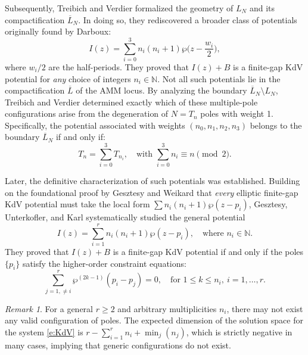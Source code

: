 \documentclass[11pt]{amsart}
\theoremstyle{remark}
\newtheorem{remark}[theorem]{Remark}
\numberwithin{equation}{section}
\begin{document}
Subsequently, Treibich and Verdier \cite{Treibich_Verdier_1990} formalized the geometry of $L_N$ and its compactification $\overline{L}_N$. In doing so, they rediscovered a broader class of potentials originally found by Darboux:
\[
    I(z) = \sum_{i=0}^3 n_i(n_i+1) \wp\Big(z- \frac{w_i}{2}\Big),
\]
where $w_i/2$ are the half-periods. They proved that $I(z)+B$ is a finite-gap KdV potential for \textit{any} choice of integers $n_i \in \mathbb{N}$. 
Not all such potentials lie in the compactification $\overline{L}$ of the AMM locus. By analyzing the boundary $\overline{L}_N \setminus L_N$, Treibich and Verdier determined exactly which of these multiple-pole configurations arise from the degeneration of $N = T_n$ poles with weight 1. Specifically, the potential associated with weights $(n_0, n_1, n_2, n_3)$ belongs to the boundary $\overline{L}_N$ if and only if:
\[
    T_n = \sum_{i=0}^3 T_{n_i}, \quad \text{with } \sum_{i=0}^3 n_i \equiv n \pmod 2.
\]

Later, the definitive characterization of such potentials was established. Building on the foundational proof by Gesztesy and Weikard \cite{Gesztesy_Weikard_Picard_1996} that \textit{every} elliptic finite-gap KdV potential must take the local form $\sum n_i(n_i+1) \wp(z-p_i)$, Gesztesy, Unterkofler, and Karl \cite{Gesztesy_Unterkofler_Karl_2006} systematically studied the general potential
\[
    I(z) = \sum_{i=1}^r n_i(n_i+1) \wp(z-p_i), \quad \text{where } n_i \in \mathbb{N}.
\]
They proved that $I(z)+B$ is a finite-gap KdV potential if and only if the poles $\{p_i\}$ satisfy the higher-order constraint equations:
\begin{equation} \label{e:KdV}
    \sum_{j=1,\neq i}^r \wp^{(2k-1)}(p_i-p_j) =0, \quad \text{for } 1\leq k \leq n_i, \ i=1,\dots,r.
\end{equation}

\begin{remark}
For a general $r \geq 2$ and arbitrary multiplicities $n_i$, there may not exist any valid configuration of poles. The expected dimension of the solution space for the system \eqref{e:KdV} is $r - \sum_{i=1}^r n_i + \min_j (n_j)$, which is strictly negative in many cases, implying that generic configurations do not exist.
\end{remark}
\end{document}
